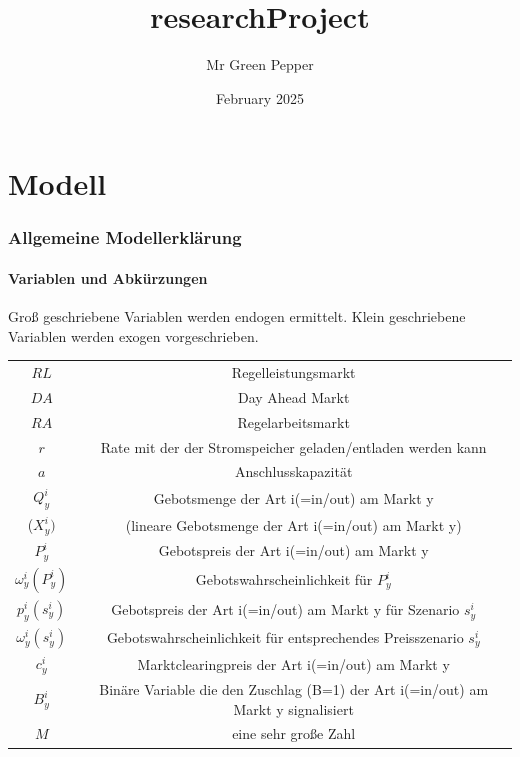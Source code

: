 \documentclass{article}
\title{researchProject}
\author{Mr Green Pepper}
\date{February 2025}
\begin{document}
\listoftodos
\doublespacing
\maketitle

\tableofcontents

\part{Modell}
\section{Allgemeine Modellerklärung}
\subsection{Variablen und Abkürzungen}
Groß geschriebene Variablen werden endogen ermittelt. Klein geschriebene Variablen werden exogen vorgeschrieben.\\

\begin{tabular}{|c|c|}
        $RL$ & Regelleistungsmarkt\\
        $DA$ & Day Ahead Markt \\
        $RA$ & Regelarbeitsmarkt \\
        $r$ & Rate mit der der Stromspeicher geladen/entladen werden kann \\
        $a$ & Anschlusskapazität \\
        $Q^i_{y}$ & Gebotsmenge der Art i(=in/out) am Markt y \\
        ($X^i_{y})$ & (lineare Gebotsmenge der Art i(=in/out) am Markt y) \\
        $P^i_{y}$ & Gebotspreis der Art i(=in/out) am Markt y\\
        $\omega^i_{y}(P^i_{y})$ & Gebotswahrscheinlichkeit für $P^i_{y}$\\
        $p^i_{y}(s^i_y)$ & Gebotspreis der Art i(=in/out) am Markt y für Szenario $s^i_y$\\
        $\omega^i_{y}(s^i_y)$ & Gebotswahrscheinlichkeit für entsprechendes Preisszenario $s^i_y$\\
        $c^i_y$ &  Marktclearingpreis der Art i(=in/out) am Markt y\\
        $B^i_y$ &  Binäre Variable die den Zuschlag (B=1) der Art i(=in/out) am Markt y signalisiert\\
        $M$ &  eine sehr große Zahl\\
    \end{tabular}
\label{tab:my_label}\\
\\
\end{document}
